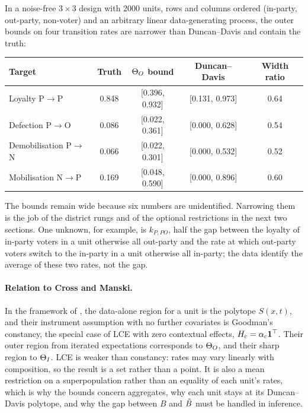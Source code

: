 In a noise-free $3\times3$ design with 2000 units, rows and columns ordered
(in-party, out-party, non-voter) and an arbitrary linear data-generating process,
the outer bounds on four transition rates are narrower than Duncan--Davis and
contain the truth:

\begin{center}\small
\begin{tabular}{@{}lcccc@{}}
\toprule
Target & Truth & $\Theta_O$ bound & Duncan--Davis & Width ratio \\
\midrule
Loyalty P$\to$P & 0.848 & [0.396, 0.932] & [0.131, 0.973] & 0.64 \\
Defection P$\to$O & 0.086 & [0.022, 0.361] & [0.000, 0.628] & 0.54 \\
Demobilisation P$\to$N & 0.066 & [0.022, 0.301] & [0.000, 0.532] & 0.52 \\
Mobilisation N$\to$P & 0.169 & [0.048, 0.590] & [0.000, 0.896] & 0.60 \\
\bottomrule
\end{tabular}
\end{center}

The bounds remain wide because six numbers are unidentified. Narrowing them is
the job of the district rungs and of the optional restrictions in the next two
sections. One unknown, for example, is $k_{P,PO}$, half the gap between the
loyalty of in-party voters in a unit otherwise all out-party and the rate at
which out-party voters switch to the in-party in a unit otherwise all in-party;
the data identify the average of these two rates, not the gap.

\paragraph{Relation to Cross and Manski.} In the framework of
\citet{crossmanski2002}, the data-alone region for a unit is the polytope
$S(x,t)$, and their instrument assumption with no further covariates is
Goodman's constancy, the special case of LCE with zero contextual effects,
$H_c=\alpha_c\mathbf 1^\top$. Their outer region from iterated expectations
corresponds to $\Theta_O$, and their sharp region to $\Theta_I$. LCE is weaker than
constancy: rates may vary linearly with composition, so the result is a set
rather than a point. It is also a mean restriction on a superpopulation rather
than an equality of each unit's rates, which is why the bounds concern
aggregates, why each unit stays at its Duncan--Davis polytope, and why the gap
between $B$ and $\tilde B$ must be handled in inference.
